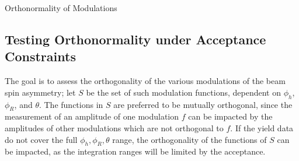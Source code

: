 \documentclass[12pt]{article}
\begin{document}
\begin{center}
{\LARGE 
Orthonormality of Modulations
}
\end{center}

\subsection*{Testing Orthonormality under Acceptance Constraints}


The goal is to assess the orthogonality of the various modulations of the beam
spin asymmetry; let $S$ be the set of such modulation functions, dependent on
$\phi_h$, $\phi_R$, and $\theta$. The functions in $S$ are preferred to be
mutually orthogonal, since the measurement of an amplitude of one modulation $f$
can be impacted by the amplitudes of other modulations which are not orthogonal
to $f$.  If the yield data do not cover the full $\phi_h,\phi_R,\theta$ range,
the orthogonality of the functions of $S$ can be impacted, as the integration
ranges will be limited by the acceptance. 
\end{document}
